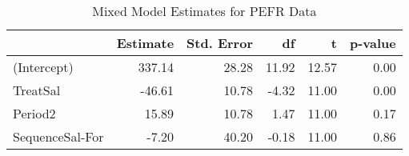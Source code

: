 \begin{table}

\caption{\label{tab:pefrDataEstimates}Mixed Model Estimates for PEFR Data}
\centering
\begin{tabular}[t]{>{}l|rrrrr}
\toprule
 & Estimate & Std. Error & df & t & p-value\\
\midrule
(Intercept) & 337.14 & 28.28 & 11.92 & 12.57 & 0.00\\
TreatSal & -46.61 & 10.78 & -4.32 & 11.00 & 0.00\\
Period2 & 15.89 & 10.78 & 1.47 & 11.00 & 0.17\\
SequenceSal-For & -7.20 & 40.20 & -0.18 & 11.00 & 0.86\\
\bottomrule
\end{tabular}
\end{table}
